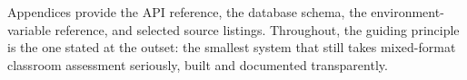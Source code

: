 Appendices provide the API reference, the database schema, the environment-variable
reference, and selected source listings. Throughout, the guiding
principle is the one stated at the outset: the smallest system that still takes
mixed-format classroom assessment seriously, built and documented transparently.

